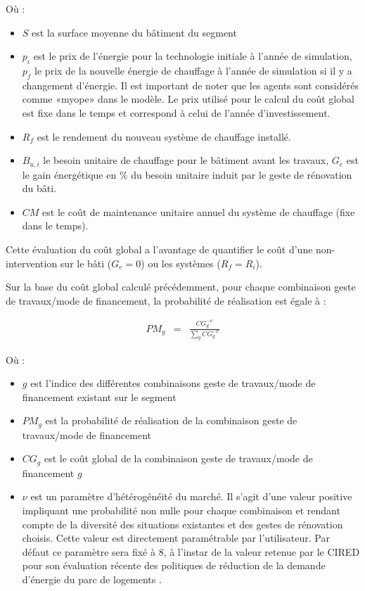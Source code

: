 \documentclass[10.5pt,a4paper]{article}
\begin{document}
{Où :
\begin{itemize}
\item $S$ est la surface moyenne du bâtiment du segment
\item $p_i$ est le prix de l’énergie pour la technologie initiale à l’année de simulation,  $p_f$ le prix de la nouvelle énergie de chauffage à l’année de simulation si il y a changement d'énergie. Il est important de noter que les agents sont considérés comme «myope» dans le modèle. Le prix utilisé pour le calcul du coût global est fixe dans le temps et correspond à celui de l’année d’investissement. 
\item $R_f$ est le rendement du nouveau système de chauffage installé.
\item $B_{u,i}$ le besoin unitaire de chauffage pour le bâtiment avant les travaux, $G_e$ est le gain énergétique en \% du besoin unitaire induit par le geste de rénovation du bâti.  
\item $CM$ est le coût de maintenance unitaire annuel du système de chauffage (fixe dans le temps). 
\end{itemize}

Cette évaluation du coût global a l’avantage de quantifier le coût d’une non-intervention sur le bâti ($G_e = 0$) ou les systèmes ($R_f = R_i$).

Sur la base du coût global calculé précédemment, pour chaque combinaison geste de travaux/mode de financement, la probabilité de réalisation est égale à :

\begin{eqnarray}
PM_g & = & \frac{CG_g^{-\nu}}{\sum_g CG_g^{-\nu}}
\end{eqnarray}


Où :
\begin{itemize}
\item$g$ est l’indice des différentes combinaisons geste de travaux/mode de financement existant sur le segment
\item $PM_g$ est la probabilité de réalisation de la combinaison geste de travaux/mode de financement
\item $CG_g$ est le coût global de la combinaison geste de travaux/mode de financement $g$
\item $\nu$ est un paramètre d’hétérogénéité du marché. Il s’agit d’une valeur positive impliquant une probabilité non nulle pour chaque combinaison et rendant compte de la diversité des situations existantes et des gestes de rénovation choisis. Cette valeur est directement paramétrable par l’utilisateur. Par défaut ce paramètre sera fixé à 8, à l’instar de la valeur retenue par le CIRED pour son évaluation récente des politiques de réduction de la demande d’énergie du parc de logements \citep{Giraudet_etal2018}.
\end{itemize}

}
\end{document}
